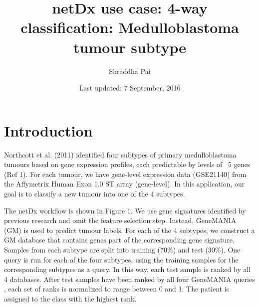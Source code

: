 \documentclass{article}\usepackage[]{graphicx}\usepackage[]{color}
\begin{document}
\title{netDx use case: 4-way classification: Medulloblastoma tumour subtype}
\author{Shraddha Pai}
\date{Last updated: 7 September, 2016}

\maketitle

\section{Introduction}
Northcott et al. (2011) identified four subtypes of primary medulloblastoma tumours based on gene expression profiles, each predictable by levels of ~5 genes (Ref 1). For each tumour, we have gene-level expression data (GSE21140) from the Affymetrix Human Exon 1.0 ST array (gene-level). In this application, our goal is to classify a new tumour into one of the 4 subtypes.
\par
The netDx workflow is shown in Figure 1. We use gene signatures identified by previous research and omit the feature selection step. Instead, GeneMANIA (GM) is used to predict tumour labels. For each of the 4 subtypes, we construct a GM database that contains genes part of the corresponding gene signature. Samples from each subtype are split into training (70\%) and test (30\%). One query is run for each of the four subtypes, using the training samples for the corresponding subtypes as a query. In this way, each test sample is ranked by all 4 databases. After test samples have been ranked by all four GeneMANIA queries , each set of ranks is normalized to range between 0 and 1.  The patient is assigned to the class with the highest rank.
\end{document}
